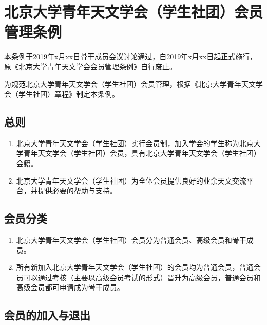 \chapter{北京大学青年天文学会（学生社团）会员管理条例}

本条例于2019年x月xx日骨干成员会议讨论通过，自2019年x月xx日起正式施行，原《北京大学青年天文学会会员管理条例》自行废止。

为规范北京大学青年天文学会（学生社团）会员管理，根据《北京大学青年天文学会（学生社团）章程》制定本条例。

\section{总则}

\begin{enumerate}
    \item 北京大学青年天文学会（学生社团）实行会员制，加入学会的学生称为北京大学青年天文学会（学生社团）会员，具有北京大学青年天文学会（学生社团）会籍。
    
    \item 北京大学青年天文学会（学生社团）为全体会员提供良好的业余天文交流平台，并提供必要的帮助与支持。
\end{enumerate}

\section{会员分类}

\begin{enumerate}[resume]
    \item 北京大学青年天文学会（学生社团）会员分为普通会员、高级会员和骨干成员。
    
    \item 所有新加入北京大学青年天文学会（学生社团）的会员均为普通会员，普通会员可以通过考核（主要以高级会员考试的形式）晋升为高级会员，普通会员和高级会员都可申请成为骨干成员。
\end{enumerate}

\section{会员的加入与退出}

